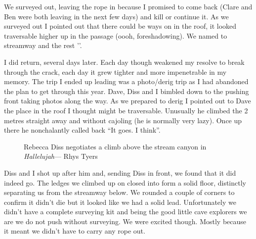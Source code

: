 We surveyed out, leaving the rope in because I promised to come back (Clare and Ben were both leaving in the next few days) and kill or continue it. As we surveyed out I pointed out that there could be ways on in the roof, it looked traversable higher up in the passage (oooh, foreshadowing). We named to streamway  and the rest ''.

 \begin{marginfigure}
\end{marginfigure}  

I did return, several days later. Each day though weakened my resolve to break through the crack, each day it grew tighter and more impenetrable in my memory. The trip I ended up leading was a photo/derig trip as I had abandoned the plan to get through this year. Dave, Diss and I bimbled down to the pushing front taking photos along the way. As we prepared to derig I pointed out to Dave the place in the roof I thought might be traversable. Unusually he climbed the 2 metres straight away and without cajoling (he is normally very lazy). Once up there he nonchalantly called back “It goes. I think”.
  \begin{figure*}[t!]
\checkoddpage \ifoddpage \forcerectofloat \else \forceversofloat \fi
     \centering
        \caption{ Rebecca Diss negotiates a climb above the stream canyon in \emph{Hallelujah}--- Rhys Tyers} \label{Diss Hallelujah}
\end{figure*} 
 
Diss and I shot up after him and, sending Diss in front, we found that it did indeed go. The ledges we climbed up on closed into form a solid floor, distinctly separating us from the streamway below. We rounded a couple of corners to confirm it didn’t die but it looked like we had a solid lead. Unfortunately we didn’t have a complete surveying kit and being the good little cave explorers we are we do not push without surveying. We were excited though. Mostly because it meant we didn’t have to carry any rope out.
 
